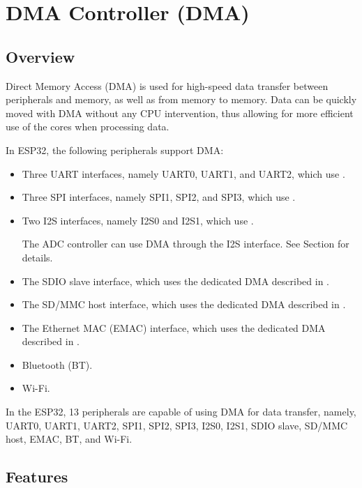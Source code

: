 \documentclass[main\_\_EN.tex]{subfiles}
\begin{document}
\hypertarget{dma}{}
\chapter{DMA Controller (DMA)}
\label{mod:dma}

\section{Overview}

Direct Memory Access (DMA) is used for high-speed data transfer between peripherals and memory, as well as from memory to memory. Data can be quickly moved with DMA without any CPU intervention, thus allowing for more efficient use of the cores when processing data.

In ESP32, the following peripherals support DMA:
\begin{itemize}
    \item Three UART interfaces, namely UART0, UART1, and UART2, which use .
    \item Three SPI interfaces, namely SPI1, SPI2, and SPI3, which use .
    \item Two I2S interfaces, namely I2S0 and I2S1, which use .
        \begin{tiplisting}
            The ADC controller can use DMA through the I2S interface. See Section  for details.
        \end{tiplisting}
    \item The SDIO slave interface, which uses the dedicated DMA described in .
    \item The SD/MMC host interface, which uses the dedicated DMA described in .
    \item The Ethernet MAC (EMAC) interface, which uses the dedicated DMA described in .
    \item Bluetooth (BT).
    \item Wi-Fi.
\end{itemize}

In the ESP32, 13 peripherals are capable of using DMA for data transfer, namely, UART0, UART1, UART2, SPI1, SPI2, SPI3, I2S0, I2S1, SDIO slave, SD/MMC host, EMAC, BT, and Wi-Fi.

\section{Features}
\end{document}
